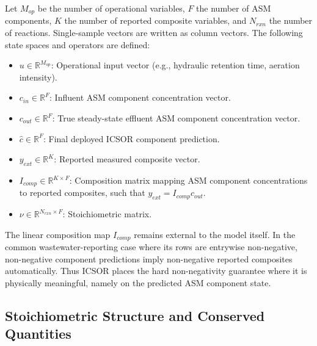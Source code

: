 \documentclass[11pt]{article}
\begin{document}
Let $M_{op}$ be the number of operational variables, $F$ the number of ASM components, $K$ the number of reported composite variables, and $N_{rxn}$ the number of reactions. Single-sample vectors are written as column vectors. The following state spaces and operators are defined:
\begin{itemize}
    \item $u \in \mathbb{R}^{M_{op}}$: Operational input vector (e.g., hydraulic retention time, aeration intensity).
    \item $c_{in} \in \mathbb{R}^{F}$: Influent ASM component concentration vector.
    \item $c_{out} \in \mathbb{R}^{F}$: True steady-state effluent ASM component concentration vector.
    \item $\hat{c} \in \mathbb{R}^{F}$: Final deployed ICSOR component prediction.
    \item $y_{ext} \in \mathbb{R}^{K}$: Reported measured composite vector.
    \item $I_{comp} \in \mathbb{R}^{K \times F}$: Composition matrix mapping ASM component concentrations to reported composites, such that $y_{ext} = I_{comp}c_{out}$.
    \item $\nu \in \mathbb{R}^{N_{rxn} \times F}$: Stoichiometric matrix.
\end{itemize}

The linear composition map $I_{comp}$ remains external to the model itself. In the common wastewater-reporting case where its rows are entrywise non-negative, non-negative component predictions imply non-negative reported composites automatically. Thus ICSOR places the hard non-negativity guarantee where it is physically meaningful, namely on the predicted ASM component state.

\subsection{Stoichiometric Structure and Conserved Quantities}
\end{document}
